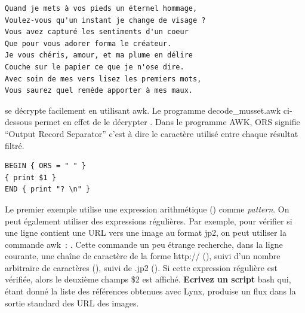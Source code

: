 \begin{center}
\begin{verbatim}
Quand je mets à vos pieds un éternel hommage,
Voulez-vous qu'un instant je change de visage ?
Vous avez capturé les sentiments d'un coeur
Que pour vous adorer forma le créateur.
Je vous chéris, amour, et ma plume en délire
Couche sur le papier ce que je n'ose dire.
Avec soin de mes vers lisez les premiers mots,
Vous saurez quel remède apporter à mes maux. 
\end{verbatim}
\end{center}

se décrypte facilement en utilisant awk. Le programme decode\_musset.awk ci-dessous permet en effet de le décrypter . Dans le programme AWK, ORS signifie ``Output Record Separator'' c'est à dire le caractère utilisé entre chaque résultat filtré.

\begin{verbatim}
BEGIN { ORS = " " } 
{ print $1 }
END { print "? \n" }
\end{verbatim}

Le premier exemple utilise une expression arithmétique () comme \emph{pattern}. On peut également utiliser des expressions régulières. Par exemple, pour vérifier si une ligne contient une URL vers une image au format jp2, on peut utiliser la commande awk~: . Cette commande un peu étrange recherche, dans la ligne courante, une chaîne de caractère de la forme http:// (), suivi d'un nombre arbitraire de caractères (), suivi de .jp2 (). Si cette expression régulière est vérifiée, alors le deuxième champs \$2 est affiché. \textbf{Ecrivez un script} bash  qui, étant donné la liste des références obtenues avec Lynx, produise un flux dans la sortie standard des URL des images.\\

